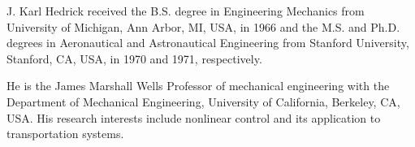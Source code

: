 \documentclass[journal]{IEEEtranTIE}
\theoremstyle{remark}
\begin{document}
{		\vspace{-1.3cm}
		\begin{IEEEbiography}
			{J. Karl Hedrick} received the B.S. degree in Engineering Mechanics from University of Michigan, Ann Arbor, MI, USA, in 1966 and the M.S. and Ph.D. degrees in Aeronautical and Astronautical Engineering from Stanford University, Stanford, CA, USA, in 1970 and 1971, respectively.
			
			He is the James Marshall Wells Professor of mechanical engineering with the Department of Mechanical Engineering, University of California, Berkeley, CA, USA. His research interests include nonlinear control and its application to transportation systems.
			\\ \\ 
		\end{IEEEbiography}
	}
	
\end{document}
